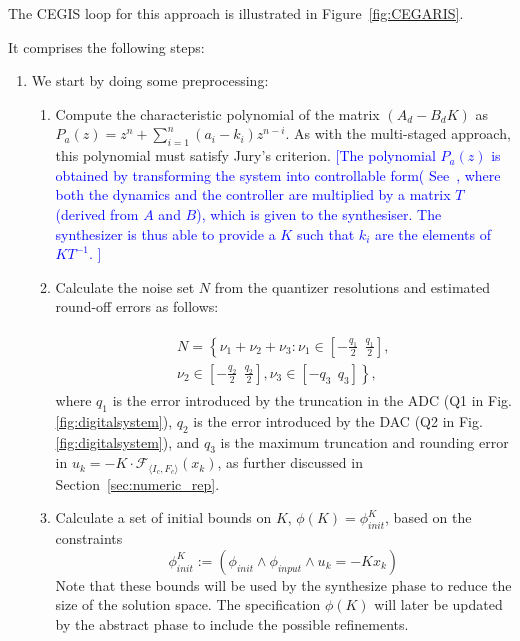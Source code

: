 \documentclass[twocolumn]{autart}    %
\newcommand{\mat}[1]{{#1}}
\newcommand{\reply}[1]{\textcolor{blue}{[#1]}}
\begin{document}
The CEGIS loop for this approach is illustrated in Figure~\ref{fig:CEGARIS}. 
%

It comprises the following steps:  
\begin{enumerate}
\item 
  We start by doing some preprocessing:%
  \begin{enumerate}
\item Compute the characteristic polynomial of the matrix $(A_d-B_dK)$ as 
$P_a(z) = z^n+\sum_{i=1}^n{(a_i-k_i)z^{n-i}}$.  As with the multi-staged approach, this polynomial must satisfy Jury's criterion.
\reply{The polynomial $P_a(z)$ is obtained by transforming the system into controllable form( See~\cite{astrom1997computer}, where both the dynamics and the controller are multiplied by a matrix $\mat{T}$ (derived from $\mat{A}$ and $\mat{B}$), which is given to the synthesiser.  The synthesizer is thus able to provide a $\mat{K}$ such that $k_i$ are the elements  of $\mat{K}\mat{T}^{-1}$.
}


\item Calculate the noise set $N$ from the quantizer resolutions and estimated round-off errors as follows: 

\begin{align*}
\nonumber
\begin{split}
N=\left \{ \nu_1+\nu_2+ \nu_3: \nu_1 \in \left[-\frac{q_1}{2}\ \ \frac{q_1}{2}\right] , \right. \\ \left. \nu_2 \in \left[-\frac{q_2}{2}\ \ \frac{q_2}{2}\right],  \nu_3 \in \left[-q_3\ \ q_3\right]  \right \}, 
\end{split}
\end{align*}
%
where  $q_1$ is the error introduced by the truncation in the ADC (Q1 in Fig. \ref{fig:digitalsystem}), 
$q_2$ is the error introduced by the DAC (Q2 in Fig. \ref{fig:digitalsystem}), 
and $q_3$ is the maximum truncation and rounding error in $u_k=-K \cdot \mathcal{F}_{\langle I_c,F_c \rangle}(x_k)$, 
as further discussed in Section~\ref{sec:numeric_rep}.

\item Calculate a set of initial bounds on $K$, $\phi(K)=\phi_\mathit{init}^{K}$,
based on the constraints %
%
$$
\phi_\mathit{init}^{K} := (\phi_\mathit{init} \wedge \phi_\mathit{input} \wedge u_k=-K x_k)
$$
Note that these bounds will be used by the {\sc synthesize} phase to reduce the size of the solution space.
The specification $\phi(K)$ will later be updated by the {\sc abstract} phase to include the possible refinements. 


\end{enumerate}
\end{enumerate}
\end{document}
